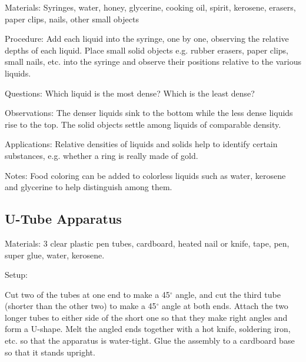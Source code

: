 \begin{multicols}{2}
\begin{description*}
\item[Materials:]{Syringes, water, honey, glycerine, cooking oil, spirit, kerosene, erasers, paper clips, nails, other small objects}
\item[Procedure:]{Add each liquid into the syringe, one by one, observing the relative depths of each liquid. Place small solid objects e.g. rubber erasers, paper clips, small nails, etc. into the syringe and observe their positions relative to the various liquids.}
\item[Questions:]{Which liquid is the most dense? Which is the least dense?}
\item[Observations:]{The denser liquids sink to the bottom while the less dense liquids rise to the top. The solid objects settle among liquids of comparable density.}
\item[Applications:]{Relative densities of liquids and solids help to identify certain substances, e.g. whether a ring is really made of gold.}
\item[Notes:]{Food coloring can be added to colorless liquids such as water, kerosene and glycerine to help distinguish among them.}
\end{description*}


\subsection{U-Tube Apparatus}
\label{sub:u-tube}

\begin{description*}
\item[Materials:]{3 clear plastic pen tubes, cardboard, heated nail or knife, tape, pen, super glue, water, kerosene.}
\item[Setup:]{Cut two of the tubes at one end to make a 45$^\circ$ angle, and cut the third tube (shorter than the other two) to make a 45$^\circ$ angle at both ends. Attach the two longer tubes to either side of the short one so that they make right angles and form a U-shape. Melt the angled ends together with a hot knife, soldering iron, etc. so that the apparatus is water-tight. Glue the assembly to a cardboard base so that it stands upright. 

}
\end{description*}
\end{multicols}
